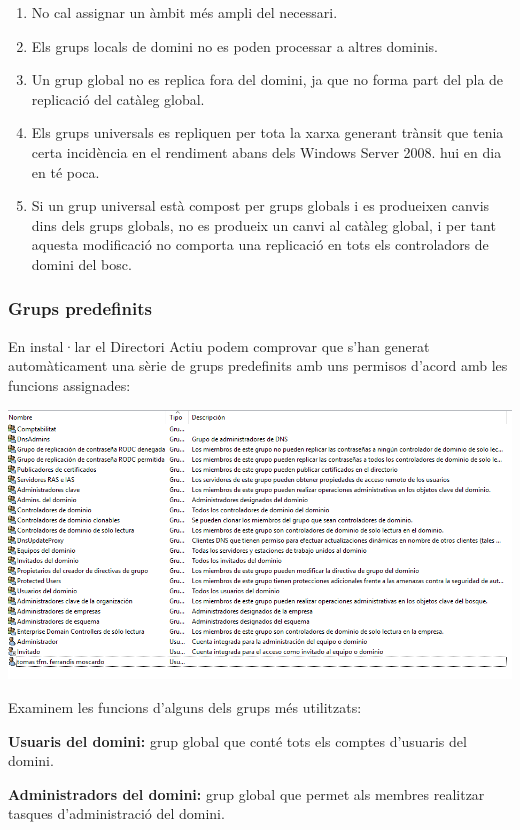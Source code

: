 \documentclass[
  a4paper,
]{article}
\begin{document}
\begin{enumerate}
\def\labelenumi{\arabic{enumi}.}
\item
  No cal assignar un àmbit més ampli del necessari.
\item
  Els grups locals de domini no es poden processar a altres dominis.
\item
  Un grup global no es replica fora del domini, ja que no forma part del
  pla de replicació del catàleg global.
\item
  Els grups universals es repliquen per tota la xarxa generant trànsit
  que tenia certa incidència en el rendiment abans dels Windows Server
  2008. hui en dia en té poca.
\item
  Si un grup universal està compost per grups globals i es produeixen
  canvis dins dels grups globals, no es produeix un canvi al catàleg
  global, i per tant aquesta modificació no comporta una replicació en
  tots els controladors de domini del bosc.
\end{enumerate}

\subsubsection{Grups predefinits}\label{grups-predefinits}

En instal·lar el Directori Actiu podem comprovar que s'han generat
automàticament una sèrie de grups predefinits amb uns permisos d'acord
amb les funcions assignades:

\includegraphics{png/usuaris10.png}

Examinem les funcions d'alguns dels grups més utilitzats:

\textbf{Usuaris del domini:} grup global que conté tots els comptes
d'usuaris del domini.

\textbf{Administradors del domini:} grup global que permet als membres
realitzar tasques d'administració del domini.
\end{document}

